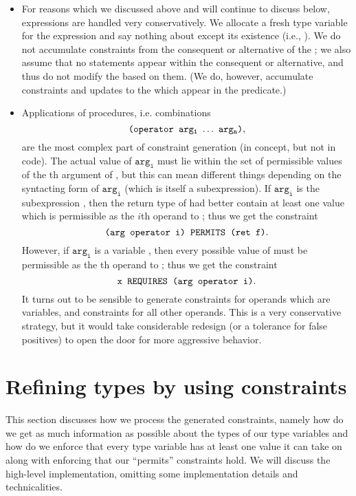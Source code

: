 \documentclass[a4paper]{article}
\begin{document}
\begin{itemize}
  \item For reasons which we discussed above and will continue to discuss below,
     expressions are handled very conservatively.  We allocate a fresh
    type variable  for the  expression and say nothing about 
    except its existence (i.e., ).  We do not accumulate
    constraints from the consequent or alternative of the ; we also assume
    that no  statements appear within the consequent or alternative,
    and thus do not modify the  based on them.  (We do, however,
    accumulate constraints and updates to the  which appear in the
    predicate.)

  \item Applications of procedures, i.e. combinations
    \[ \T{(operator }\mathtt{arg_1\ \ldots\ arg_n}\T{)}, \]
    are the most complex part of constraint generation (in concept, but not in
    code).  The actual value of $\mathtt{arg_i}$ must lie within the set of
    permissible values of the th argument of , but this can mean
    different things depending on the syntacting form of $\mathtt{arg_i}$ (which
    is itself a subexpression).  If $\mathtt{arg_i}$ is the subexpression , then the return type of  had better contain at least one value
    which is permissible as the $i$th operand to ; thus we get the
    constraint
    \[ \texttt{(arg operator i) PERMITS (ret f)}. \]
    However, if $\mathtt{arg_i}$ is a variable , then every possible value
    of  must be permissible as the th operand to ; thus we
    get the constraint
    \[ \texttt{x REQUIRES (arg operator i)}. \]
    It turns out to be sensible to generate  constraints for operands
    which are variables, and  constraints for all other operands.
    This is a very conservative strategy, but it would take considerable
    redesign (or a tolerance for false positives) to open the door for more
    aggressive behavior.
\end{itemize}


\section{Refining types by using constraints}

This section discusses how we process the generated constraints, namely how do 
we get as much information as possible about the types of our type variables 
and how do we enforce that every type variable has at least one value it can 
take on along with enforcing that our ``permits'' constraints hold.  We will 
discuss the high-level implementation, omitting some implementation details 
and technicalities.
\end{document}
